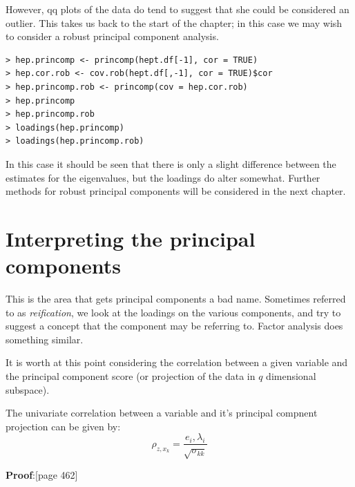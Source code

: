 



However, qq plots of the data do tend to suggest that she could be considered an outlier.   This takes us back to the start of the chapter; in this case we may wish to consider a robust principal component analysis.

\singlespacing
\begin{verbatim}
> hep.princomp <- princomp(hept.df[-1], cor = TRUE)
> hep.cor.rob <- cov.rob(hept.df[,-1], cor = TRUE)$cor
> hep.princomp.rob <- princomp(cov = hep.cor.rob)
> hep.princomp
> hep.princomp.rob
> loadings(hep.princomp)
> loadings(hep.princomp.rob)
\end{verbatim}
\onehalfspacing

In this case it should be seen that there is only a slight difference between the estimates for the eigenvalues, but the loadings do alter somewhat.   Further methods for robust principal components will be considered in the next chapter.


\section{Interpreting the principal components}

This is the area that gets principal components a bad name.   Sometimes referred to as \textit{reification}, we look at the loadings on the various components, and try to suggest a concept that the component may be referring to.    Factor analysis does something similar.

It is worth at this point considering the correlation between a given variable and the principal component score (or projection of the data in $q$ dimensional subspace).

\begin{definition}
The univariate correlation between a variable and it's principal compnent projection can be given by:
\begin{displaymath}
\rho_{z,x_{k}} = \frac{e_{i}, \lambda_{i}}{\sqrt{\sigma_{kk}}}
\end{displaymath}
\end{definition}
\textbf{Proof}:[page 462] \cite{Johnson+Wichern:2002}


